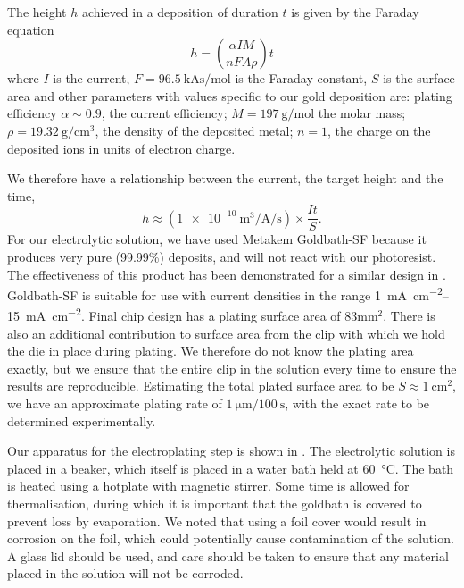 The height $h$ achieved in a deposition of duration $t$ is given by the Faraday
equation~\cite{Ruythooren_2000}
%
\begin{equation}
  h = \left(\frac{\alpha I M}{nFA\rho}\right)t
  \label{fab:eqn:faraday}
\end{equation}
%
where $I$ is the current, $F=\SI{96.5}{\kilo\ampere\second\per\mole}$ is the
Faraday constant, $S$ is the surface area and other parameters with values
specific to our gold deposition are: plating efficiency $\alpha\sim0.9$, the current efficiency;
$M = \SI{197}{\gram\per\mole}$ the molar mass;
$\rho=\SI{19.32}{\gram\per\centi\meter\cubed}$, the density of the deposited
metal; $n=1$, the charge on the deposited ions in units of electron charge.

We therefore have a relationship between the current, the target height and the
time,
%
\begin{equation}
  h \approx \left(
  \SI[per-mode=fraction]{1e-10}{\meter\cubed\per\ampere\per\second} \right)
  \times\frac{It}{S}.
\end{equation}
%
For our electrolytic solution, we have used Metakem Goldbath-SF because it
produces very pure (99.99\%) deposits, and will not react with our photoresist.
The effectiveness of this product has been demonstrated for a similar design in
.
%
Goldbath-SF is suitable for use with current densities in the range
\SIrange{1}{15}{\milli\ampere\per\centi\meter\squared}. Final chip design has a
plating surface area of $83\si{\milli\meter\squared}$. There is also an
additional contribution to surface area from the clip with which we hold the
die in place during plating. We therefore do not know the plating area
exactly, but we ensure that the entire clip in the solution every time to
ensure the results are reproducible. Estimating the total plated surface area
to be $S\approx\SI{1}{\centi\meter\squared}$, we have an approximate plating
rate of $\SI{1}{\micro\meter}/\SI{100}{\second}$, with the exact rate to be
determined experimentally.

Our apparatus for the electroplating step is shown in
. The electrolytic solution is placed in a
beaker, which itself is placed in a water bath held at \SI{60}{\celsius}. The
bath is heated using a hotplate with magnetic stirrer. Some time is allowed for
thermalisation, during which it is important that the goldbath is covered to
prevent loss by evaporation. We noted that using a foil cover would result in
corrosion on the foil, which could potentially cause contamination of the
solution. A glass lid should be used, and care should be taken to ensure that
any material placed in the solution will not be corroded.


